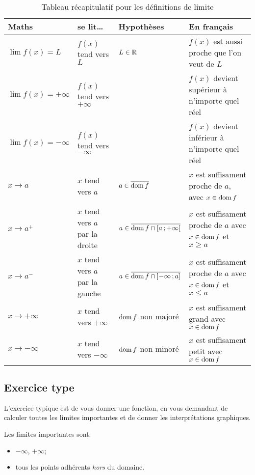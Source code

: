 \documentclass[main.tex]{subfiles}
\begin{document}
\begin{sidewaystable}
    \centering
    \caption{Tableau récapitulatif pour les définitions de limite}\label{table:limit_definition}
    \begin{tabular}
        {l l l l}
        \toprule
        Maths & se lit\dots & Hypothèses & En français \\ \midrule
        $\lim f(x) = L$ & $f(x)$ tend vers $L$ & $L \in \mathbb{R}$ & $f(x)$ est aussi proche que l'on veut de $L$ \\
        $\lim f(x) = +\infty$ & $f(x)$ tend vers $+\infty$ & & $f(x)$ devient supérieur à n'importe quel réel\\
        $\lim f(x) = -\infty$ & $f(x)$ tend vers $-\infty$ & & $f(x)$ devient inférieur à n'importe quel réel\\
        $x \to a$ & $x$ tend vers $a$ & $a \in \overline{\operatorname{dom} f}$ & $x$ est suffisament proche de $a$, avec $x \in \operatorname{dom} f$\\
        $x \to a^+$ & $x$ tend vers $a$ par la droite & $a \in \overline{\operatorname{dom} f \cap \mathopen{[}a\,;+\infty\mathclose{[}}$ & $x$ est suffisament proche de $a$ avec $x \in \operatorname{dom} f$ et $x \geq a$\\
        $x \to a^-$ & $x$ tend vers $a$ par la gauche & $a \in \overline{\operatorname{dom} f \cap \mathopen{]}-\infty\,;a\mathclose{]}}$ & $x$ est suffisament proche de $a$ avec $x \in \operatorname{dom} f$ et $x \leq a$\\
        $x \to +\infty$ & $x$ tend vers $+\infty$ & $\operatorname{dom} f$ non majoré & $x$ est suffisament grand avec $x \in \operatorname{dom} f$\\
        $x \to -\infty$ & $x$ tend vers $-\infty$ & $\operatorname{dom} f$ non minoré & $x$ est suffisament petit avec $x \in \operatorname{dom} f$\\
        \bottomrule
    \end{tabular}
\end{sidewaystable}

\subsection{Exercice type}

L'exercice typique est de vous donner une fonction,
en vous demandant de calculer toutes les limites importantes
et de donner les interprétations graphiques.

Les limites importantes sont:
\begin{itemize}
    \item $-\infty$, $+\infty$;
    \item tous les points adhérents \emph{hors} du domaine.
\end{itemize}
\end{document}

